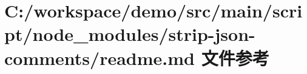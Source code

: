 \hypertarget{node__modules_2strip-json-comments_2_r_e_a_d_m_e_8md}{}\section{C\+:/workspace/demo/src/main/script/node\+\_\+modules/strip-\/json-\/comments/readme.md 文件参考}
\label{node__modules_2strip-json-comments_2_r_e_a_d_m_e_8md}
